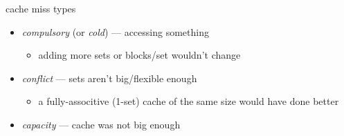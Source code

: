 \begin{frame}{cache miss types}
    \begin{itemize}
        \item \textit{compulsory} (or \textit{cold}) ---  accessing something
            \begin{itemize}
            \item adding more sets or blocks/set wouldn't change
            \end{itemize}
        \item \textit{conflict} --- sets aren't big/flexible enough
            \begin{itemize}
            \item a fully-associtive (1-set) cache of the same size would have done better
            \end{itemize}
        \item \textit{capacity} --- cache was not big enough
    \end{itemize}
\end{frame}
